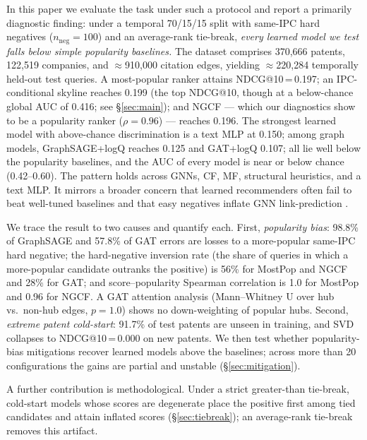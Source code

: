 \documentclass[preprint,12pt]{elsarticle}
\begin{document}
In this paper we evaluate the task under such a protocol and report a primarily
diagnostic finding: under a temporal 70/15/15 split with same-IPC hard negatives
($n_{\mathrm{neg}}=100$) and an average-rank tie-break, \emph{every learned model we
test falls below simple popularity baselines.} The dataset comprises 370,666
patents, 122,519 companies, and $\approx$910,000 citation edges, yielding
$\approx$220,284 temporally held-out test queries. A most-popular ranker attains
NDCG@10\,=\,0.197; an IPC-conditional skyline reaches 0.199 (the top NDCG@10, though
at a below-chance global AUC of 0.416; see \S\ref{sec:main}); and NGCF --- which our
diagnostics show to be a popularity ranker ($\rho=0.96$) --- reaches 0.196. The
strongest learned model with above-chance discrimination is a text MLP at 0.150;
among graph models, GraphSAGE+logQ reaches 0.125 and GAT+logQ 0.107; all lie well
below the popularity baselines, and the AUC of every model is near or below chance
(0.42--0.60). The pattern holds across GNNs, CF, MF, structural heuristics, and a
text MLP. It mirrors a broader concern that learned recommenders often fail to beat
well-tuned baselines \cite{dacrema2019} and that easy negatives inflate GNN
link-prediction \cite{li2023}.

We trace the result to two causes and quantify each. First, \emph{popularity bias}:
98.8\% of GraphSAGE and 57.8\% of GAT errors are losses to a more-popular same-IPC
hard negative; the hard-negative inversion rate (the share of queries in which a more-popular candidate outranks the positive) is 56\% for MostPop and NGCF and 28\%
for GAT; and score--popularity Spearman correlation is 1.0 for MostPop and 0.96 for
NGCF. A GAT attention analysis (Mann--Whitney U over hub vs.\ non-hub edges,
$p=1.0$) shows no down-weighting of popular hubs. Second, \emph{extreme patent
cold-start}: 91.7\% of test patents are unseen in training, and SVD collapses to
NDCG@10\,=\,0.000 on new patents. We then test whether popularity-bias mitigations
recover learned models above the baselines; across more than 20 configurations the
gains are partial and unstable (\S\ref{sec:mitigation}).

A further contribution is methodological. Under a strict greater-than tie-break,
cold-start models whose scores are degenerate place the positive first among tied
candidates and attain inflated scores (\S\ref{sec:tiebreak}); an average-rank
tie-break removes this artifact.
\end{document}
